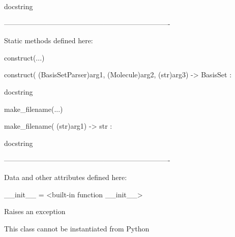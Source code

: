 \documentclass[letterpaper,10pt,english]{sphinxmanual}
\begin{document}
\begin{description}
\begin{description}
\begin{DUlineblock}{0em}
\begin{DUlineblock}{\DUlineblockindent}
\begin{DUlineblock}{\DUlineblockindent}
\item[] docstring
\item[] 
\end{DUlineblock}
\end{DUlineblock}
\item[] ----------------------------------------------------------------------
\item[] Static methods defined here:
\item[] 
\item[] construct(...)
\item[]
\begin{DUlineblock}{\DUlineblockindent}
\item[] construct( (BasisSetParser)arg1, (Molecule)arg2, (str)arg3) -\textgreater{} BasisSet :
\item[]
\begin{DUlineblock}{\DUlineblockindent}
\item[] docstring
\item[] 
\end{DUlineblock}
\end{DUlineblock}
\item[] make\_filename(...)
\item[]
\begin{DUlineblock}{\DUlineblockindent}
\item[] make\_filename( (str)arg1) -\textgreater{} str :
\item[]
\begin{DUlineblock}{\DUlineblockindent}
\item[] docstring
\item[] 
\end{DUlineblock}
\end{DUlineblock}
\item[] ----------------------------------------------------------------------
\item[] Data and other attributes defined here:
\item[] 
\item[] \_\_init\_\_ = \textless{}built-in function \_\_init\_\_\textgreater{}
\item[]
\begin{DUlineblock}{\DUlineblockindent}
\item[] Raises an exception
\item[] This class cannot be instantiated from Python
\item[] 
\end{DUlineblock}

\end{DUlineblock}
\end{description}
\end{description}
\end{document}
